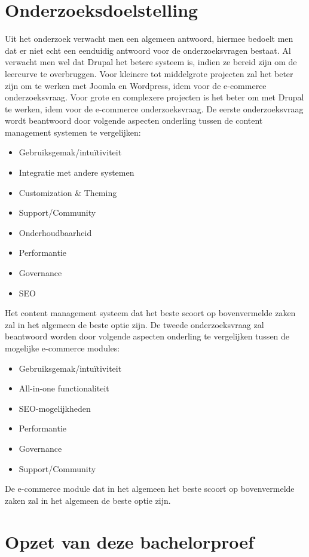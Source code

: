 \section{Onderzoeksdoelstelling}
\label{sec:onderzoeksdoelstelling}
Uit het onderzoek verwacht men een algemeen antwoord, hiermee bedoelt men dat er niet echt een eenduidig antwoord voor de onderzoeksvragen bestaat. Al verwacht men wel dat Drupal het betere systeem is, indien ze bereid zijn om de leercurve te overbruggen. Voor kleinere tot middelgrote projecten zal het beter zijn om te werken met Joomla en Wordpress, idem voor de e-commerce onderzoeksvraag. Voor grote en complexere projecten is het beter om met Drupal te werken, idem voor de e-commerce onderzoeksvraag. De eerste onderzoeksvraag wordt beantwoord door volgende aspecten onderling tussen de content management systemen te vergelijken:
\begin{itemize}
    \item Gebruiksgemak/intuïtiviteit
    \item Integratie met andere systemen
    \item Customization & Theming
    \item Support/Community
    \item Onderhoudbaarheid
    \item Performantie
    \item Governance
    \item SEO
\end{itemize}

Het content management systeem dat het beste scoort op bovenvermelde zaken zal in het algemeen de beste optie zijn. De tweede onderzoeksvraag zal beantwoord worden door volgende aspecten onderling te vergelijken tussen de mogelijke e-commerce modules:
\begin{itemize}
    \item Gebruiksgemak/intuïtiviteit
    \item All-in-one functionaliteit
    \item SEO-mogelijkheden
    \item Performantie
    \item Governance
    \item Support/Community
\end{itemize}

De e-commerce module dat in het algemeen het beste scoort op bovenvermelde zaken zal in het algemeen de beste optie zijn.

\section{Opzet van deze bachelorproef}
\label{sec:opzet-bachelorproef}

